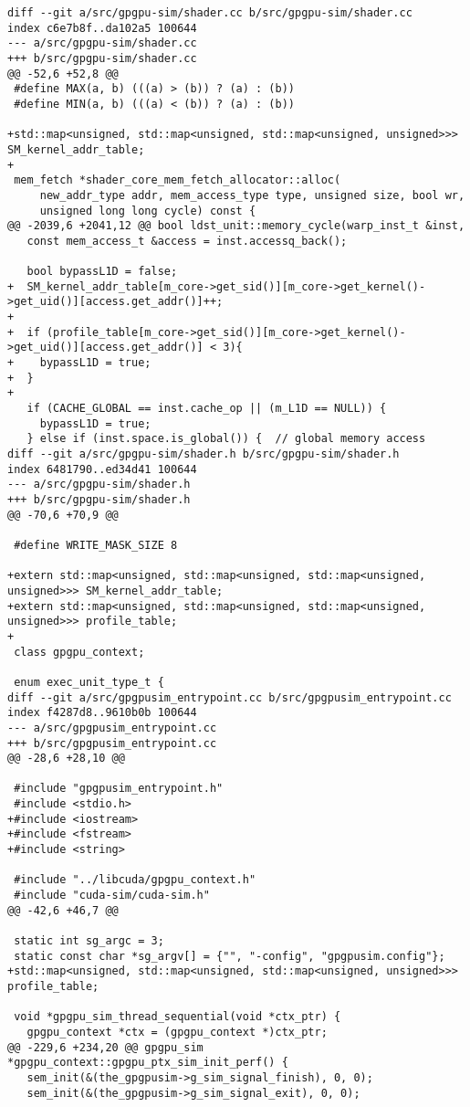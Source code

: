 \documentclass{article}
\begin{document}
\begin{verbatim}
diff --git a/src/gpgpu-sim/shader.cc b/src/gpgpu-sim/shader.cc
index c6e7b8f..da102a5 100644
--- a/src/gpgpu-sim/shader.cc
+++ b/src/gpgpu-sim/shader.cc
@@ -52,6 +52,8 @@
 #define MAX(a, b) (((a) > (b)) ? (a) : (b))
 #define MIN(a, b) (((a) < (b)) ? (a) : (b))
 
+std::map<unsigned, std::map<unsigned, std::map<unsigned, unsigned>>> SM_kernel_addr_table;
+
 mem_fetch *shader_core_mem_fetch_allocator::alloc(
     new_addr_type addr, mem_access_type type, unsigned size, bool wr,
     unsigned long long cycle) const {
@@ -2039,6 +2041,12 @@ bool ldst_unit::memory_cycle(warp_inst_t &inst,
   const mem_access_t &access = inst.accessq_back();
 
   bool bypassL1D = false;
+  SM_kernel_addr_table[m_core->get_sid()][m_core->get_kernel()->get_uid()][access.get_addr()]++;
+
+  if (profile_table[m_core->get_sid()][m_core->get_kernel()->get_uid()][access.get_addr()] < 3){
+    bypassL1D = true;
+  }
+
   if (CACHE_GLOBAL == inst.cache_op || (m_L1D == NULL)) {
     bypassL1D = true;
   } else if (inst.space.is_global()) {  // global memory access
diff --git a/src/gpgpu-sim/shader.h b/src/gpgpu-sim/shader.h
index 6481790..ed34d41 100644
--- a/src/gpgpu-sim/shader.h
+++ b/src/gpgpu-sim/shader.h
@@ -70,6 +70,9 @@
 
 #define WRITE_MASK_SIZE 8
 
+extern std::map<unsigned, std::map<unsigned, std::map<unsigned, unsigned>>> SM_kernel_addr_table;
+extern std::map<unsigned, std::map<unsigned, std::map<unsigned, unsigned>>> profile_table;
+
 class gpgpu_context;
 
 enum exec_unit_type_t {
diff --git a/src/gpgpusim_entrypoint.cc b/src/gpgpusim_entrypoint.cc
index f4287d8..9610b0b 100644
--- a/src/gpgpusim_entrypoint.cc
+++ b/src/gpgpusim_entrypoint.cc
@@ -28,6 +28,10 @@
 
 #include "gpgpusim_entrypoint.h"
 #include <stdio.h>
+#include <iostream>
+#include <fstream>
+#include <string>
 
 #include "../libcuda/gpgpu_context.h"
 #include "cuda-sim/cuda-sim.h"
@@ -42,6 +46,7 @@
 
 static int sg_argc = 3;
 static const char *sg_argv[] = {"", "-config", "gpgpusim.config"};
+std::map<unsigned, std::map<unsigned, std::map<unsigned, unsigned>>> profile_table;
 
 void *gpgpu_sim_thread_sequential(void *ctx_ptr) {
   gpgpu_context *ctx = (gpgpu_context *)ctx_ptr;
@@ -229,6 +234,20 @@ gpgpu_sim *gpgpu_context::gpgpu_ptx_sim_init_perf() {
   sem_init(&(the_gpgpusim->g_sim_signal_finish), 0, 0);
   sem_init(&(the_gpgpusim->g_sim_signal_exit), 0, 0);
 

\end{verbatim}
\end{document}
